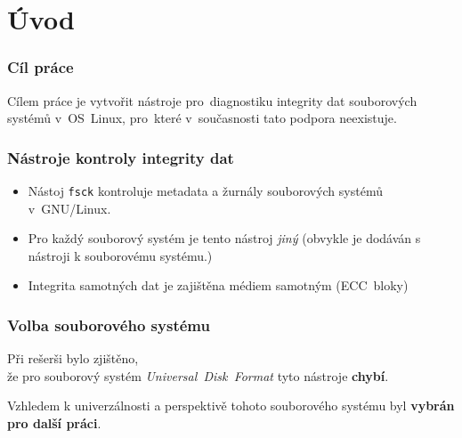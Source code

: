 \documentclass[aspectratio=169]{beamer}
\begin{document}
	\section{Úvod}
		\begin{frame}
			\frametitle{Cíl práce}
			\vspace{40 pt}
            \center
			\huge Cílem práce je vytvořit nástroje pro~diagnostiku integrity dat souborových systémů v~OS~Linux, pro~které v~současnosti tato podpora neexistuje.
		\end{frame}
        \begin{frame}
            \frametitle{Nástroje kontroly integrity dat}
            \begin{itemize}
                \Large\item Nástoj \texttt{fsck} kontroluje metadata a žurnály souborových systémů v~GNU/Linux.
                \Large\item Pro každý souborový systém je tento nástroj \textit{jiný} (obvykle je dodáván s nástroji k souborovému systému.)
                \Large\item Integrita samotných dat je zajištěna médiem samotným (ECC~bloky)
            \end{itemize}
        \end{frame}
        \begin{frame}
            \frametitle{Volba souborového systému}
            \vspace{30pt}
            \huge
            \center
            Při rešerši bylo zjištěno,\\že pro souborový systém \textit{Universal~Disk~Format} tyto nástroje \textbf{chybí}.

            \vspace{30pt} 
            \Large
            Vzhledem k univerzálnosti a perspektivě tohoto souborového systému byl \textbf{vybrán pro další práci}.
        \end{frame}
\end{document}
